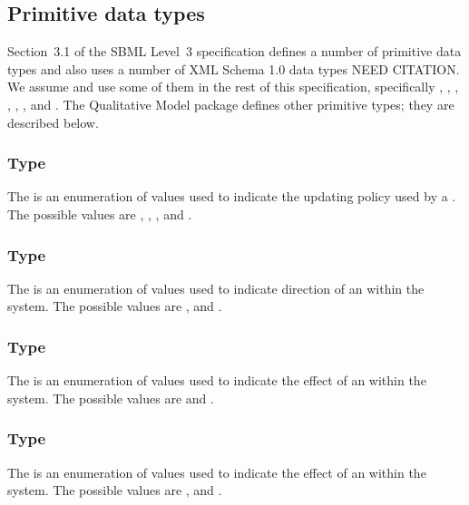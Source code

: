\subsection{Primitive data types}
\label{primitive-types}

Section~3.1 of the SBML Level~3 specification defines a number of
primitive data types and also uses a number of XML Schema 1.0 data
types NEED CITATION.  We assume and use some of them in the rest of
this specification, specifically , ,
, , ,
, and . The Qualitative Model package defines other primitive types;
they are described below.


\subsubsection{Type \fixttspace{}}
\label{primtype-temporisation}

The  is an enumeration of values used to indicate the updating policy used by a \Transition.  The possible values are , , ,  and .

\subsubsection{Type \fixttspace{}}
\label{primtype-sign}

The  is an enumeration of values used to indicate direction of an \Input within the system.  The possible values are ,  and .

\subsubsection{Type \fixttspace{}}
\label{primtype-inputeffect}
The  is an enumeration of values used to indicate the effect of an \Input \Transition within the system.  The possible values are  and .

\subsubsection{Type \fixttspace{}}
\label{primtype-outputeffect}
The  is an enumeration of values used to indicate the effect of an \Output \Transition within the system.  The possible values are ,  and .

